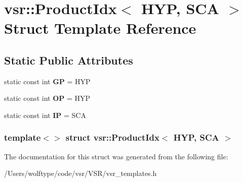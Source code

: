 \hypertarget{structvsr_1_1_product_idx_3_01_h_y_p_00_01_s_c_a_01_4}{\section{vsr\-:\-:Product\-Idx$<$ H\-Y\-P, S\-C\-A $>$ Struct Template Reference}
\label{structvsr_1_1_product_idx_3_01_h_y_p_00_01_s_c_a_01_4}
}
\subsection*{Static Public Attributes}
\begin{DoxyCompactItemize}
\item 
\hypertarget{structvsr_1_1_product_idx_3_01_h_y_p_00_01_s_c_a_01_4_af021d140602ce325c3047dbf4fbd5438}{static const int {\bfseries G\-P} = H\-Y\-P}\label{structvsr_1_1_product_idx_3_01_h_y_p_00_01_s_c_a_01_4_af021d140602ce325c3047dbf4fbd5438}

\item 
\hypertarget{structvsr_1_1_product_idx_3_01_h_y_p_00_01_s_c_a_01_4_a6b90db99297e41172507041db96f1c26}{static const int {\bfseries O\-P} = H\-Y\-P}\label{structvsr_1_1_product_idx_3_01_h_y_p_00_01_s_c_a_01_4_a6b90db99297e41172507041db96f1c26}

\item 
\hypertarget{structvsr_1_1_product_idx_3_01_h_y_p_00_01_s_c_a_01_4_ab589c80c17c8a3a763146346c3978dfc}{static const int {\bfseries I\-P} = S\-C\-A}\label{structvsr_1_1_product_idx_3_01_h_y_p_00_01_s_c_a_01_4_ab589c80c17c8a3a763146346c3978dfc}

\end{DoxyCompactItemize}
\subsubsection*{template$<$$>$ struct vsr\-::\-Product\-Idx$<$ H\-Y\-P, S\-C\-A $>$}



The documentation for this struct was generated from the following file\-:\begin{DoxyCompactItemize}
\item 
/\-Users/wolftype/code/vsr/\-V\-S\-R/vsr\-\_\-templates.\-h\end{DoxyCompactItemize}
